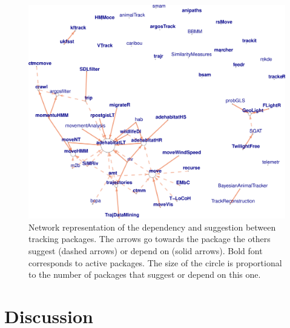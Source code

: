 \documentclass[a4paper,12pt]{article}
\begin{document}
	
	\begin{figure}
		\centering
		\includegraphics[width=1\textwidth]{./mes_images/NetworkImportSuggestTrack2.pdf}
		\caption{\label{fig:NetImpSuggMov} Network representation of the dependency and suggestion between tracking packages. The arrows go towards the package the others suggest (dashed arrows) or depend on (solid arrows). Bold font corresponds to active packages. The size of the circle is proportional to the number of packages that suggest or depend on this one.}
	\end{figure}
	
	\section*{Discussion}
	
\end{document}
